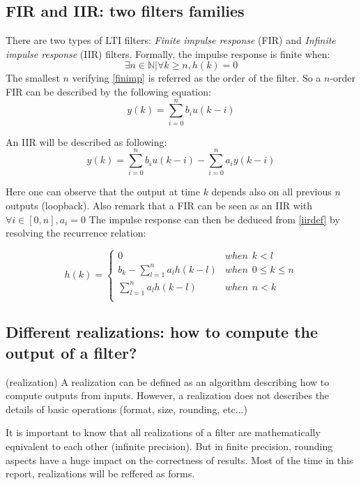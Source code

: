 	\subsection{FIR and IIR: two filters families}
	There are two types of LTI filters: \textit{Finite impulse response} (FIR) and \textit{Infinite impulse response} (IIR) filters.
	Formally, the impulse response is finite when:
	\begin{equation} \label{finimp}
		\exists n \in \mathbb{N} | \forall k \geq n, h(k)=0
	\end{equation}
	The smallest $n$ verifying \ref{finimp} is referred as the order of the filter. So a $n$-order FIR can be described by the
	following equation:
	\begin{equation} \label{firdef}
		y(k)=\sum_{i=0}^n b_i u(k-i)
	\end{equation}

	An IIR will be described as following:
	\begin{equation} \label{iirdef}
		y(k)=\sum_{i=0}^n b_i u(k-i) - \sum_{i=0}^n a_i y(k-i)
	\end{equation}

	Here one can observe that the output at time $k$ depends also on all previous $n$ outputs (loopback). 
	Also remark that a FIR can be seen as an IIR with $\forall i \in [0,n],a_i=0$
	The impulse response can then be deduced from \ref{iirdef} by resolving the recurrence relation:

	\begin{equation}
		h(k) =
		\begin{cases}
			0 & when \hspace{5pt} k<l\\
			b_k - \sum_{l=1}^n a_l h(k-l) & when \hspace{5pt} 0\leq k \leq n\\
			\sum_{l=1}^n a_l h(k-l) & when \hspace{5pt} n< k\\
		\end{cases}
	\end{equation}

	\subsection{Different realizations: how to compute the output of a filter?}
	\begin{thdef} (realization)
	A realization can be defined as an algorithm describing how to compute outputs
	from inputs. However, a realization does not describes the details of basic operations (format, size,
	rounding, etc...)
	\end{thdef}
	It is important to know that all realizations of a filter are mathematically equivalent to each other (infinite
	precision). But in finite precision, rounding aspects have a huge impact on the correctness of results.
	Most of the time in this report, realizations will be reffered as forms.

